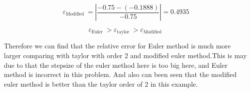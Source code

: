 \begin{solution}
$$
\varepsilon_{\text {Modified }}=\left|\frac{-0.75-(-0.1888)}{-0.75}\right|=0.4935
$$


$$
\varepsilon_{\text {Euler }}>\varepsilon_{\text {taylor }}>\varepsilon_{\text {Modified }}
$$

Therefore we can find that the relative error for Euler method is much more larger comparing with taylor with order 2 and modified euler method.This is may due to that the stepsize of the euler method here is too big here, and Euler method is incorrect in this problem. And also can been seen that the modified euler method is better than the taylor order of 2 in this example.





































\end{solution}


